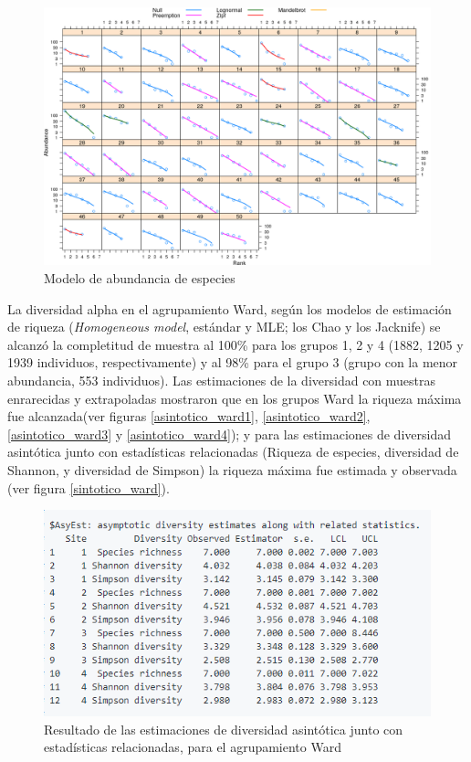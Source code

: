 \documentclass[11pt,]{article}
\begin{document}
\begin{figure}
\centering
\includegraphics{modelodeabundancia.png}
\caption{Modelo de abundancia de especies \label{fig:modelo_abundancia}}
\end{figure}

La diversidad alpha en el agrupamiento Ward, según los modelos de
estimación de riqueza (\emph{Homogeneous model}, estándar y MLE; los
Chao y los Jacknife) se alcanzó la completitud de muestra al 100\% para
los grupos 1, 2 y 4 (1882, 1205 y 1939 individuos, respectivamente) y al
98\% para el grupo 3 (grupo con la menor abundancia, 553 individuos).
Las estimaciones de la diversidad con muestras enrarecidas y
extrapoladas mostraron que en los grupos Ward la riqueza máxima fue
alcanzada(ver figuras \ref{asintotico_ward1}, \ref{asintotico_ward2},
\ref{asintotico_ward3} y \ref{asintotico_ward4}); y para las
estimaciones de diversidad asintótica junto con estadísticas
relacionadas (Riqueza de especies, diversidad de Shannon, y diversidad
de Simpson) la riqueza máxima fue estimada y observada (ver figura
\ref{sintotico_ward}).

\begin{figure}
\centering
\includegraphics{sintotico_ward.png}
\caption{Resultado de las estimaciones de diversidad asintótica junto
con estadísticas relacionadas, para el agrupamiento Ward
\label{fig:sintotico_ward}}
\end{figure}
\end{document}
